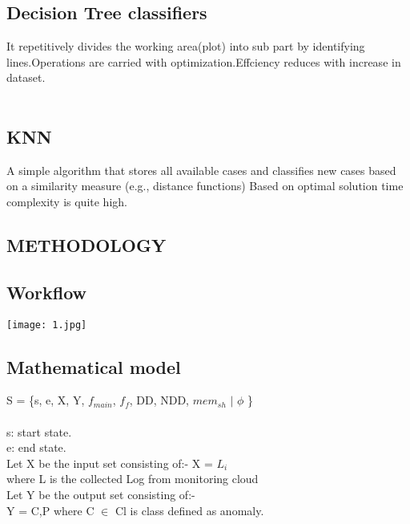 \documentclass[a4paper, 12pt]{article}
\begin{document}
\subsection{Decision Tree classifiers}
\par
\hspace
It repetitively divides
the working area(plot)
into sub part
by identifying
lines.Operations are
carried with
optimization.Effciency reduces
with increase
in dataset.
\\
\\


\subsection{KNN}
\par 
\hspace
A simple algorithm
that stores
all available
cases and classifies
new cases
based on
a similarity
measure (e.g.,
distance functions)
Based on optimal
solution
time complexity
is quite
high.
\newpage
\begin{center}
\section{METHODOLOGY}

\end{center}
\subsection{Workflow}
\texttt{[image: 1.jpg]}
\newpage
\subsection{Mathematical model}
\par
S = \{s, e, X, Y, $f_{main}$, $f_f$, DD, NDD, $mem_{sh}$ $\vert$  $\phi$ \}\\\\
 s: start state.\\
 e: end state.\\

Let X be the input set consisting of:-  X = $L_i$\\
where L is the collected Log from monitoring cloud \\
Let Y be the output set consisting of:-\\
Y = {C,P} where C $\in$ Cl is class defined as anomaly. \\\\
\end{document}
